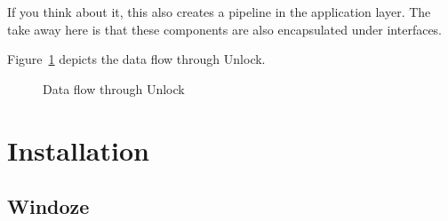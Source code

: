 \documentclass[11pt]{article}
\begin{document}
If you think about it, this also creates a pipeline in the application layer.  The take away here is that these components are also encapsulated under interfaces.

Figure~\ref{bci-pipeline-fig} depicts the data flow through Unlock.

\begin{figure}[]
\caption{\label{bci-pipeline-fig}  Data flow through Unlock}
\end{figure}



\section{Installation}
\subsection{Windoze}
%
%
\end{document}

